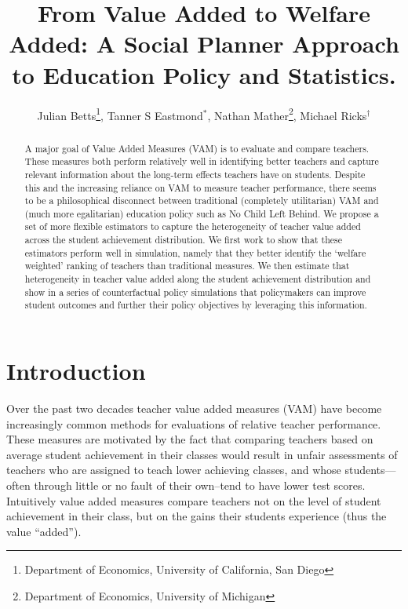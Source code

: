 \documentclass[letterpaper,12pt]{article}
\title{From Value Added to Welfare Added: A Social Planner Approach to Education Policy and Statistics.}
\author{Julian Betts\thanks{Department of Economics, University of California, San Diego}, Tanner S Eastmond$^*$,  Nathan Mather\thanks{Department of Economics, University of Michigan}, Michael Ricks$^\dagger$}
\date{\vspace{-8ex}}
\begin{document}
\maketitle





\begin{abstract}
    A major goal of Value Added Measures (VAM) is to evaluate and compare teachers. These measures both perform relatively well in identifying better teachers and capture relevant information about the long-term effects teachers have on students. Despite this and the increasing reliance on VAM to measure teacher performance, there seems to be a philosophical disconnect between traditional (completely utilitarian) VAM and (much more egalitarian) education policy such as No Child Left Behind. We propose a set of more flexible estimators to capture the heterogeneity of teacher value added across the student achievement distribution. We first work to show that these estimators perform well in simulation, namely that they better identify the ‘welfare weighted’ ranking of teachers than traditional measures. We then estimate that heterogeneity in teacher value added along the student achievement distribution and show in a series of counterfactual policy simulations that policymakers can improve student outcomes and further their policy objectives by leveraging this information.
\end{abstract}





\section{Introduction}

Over the past two decades teacher value added measures (VAM) have become increasingly common methods for evaluations of relative teacher performance. These measures are motivated by the fact that comparing teachers based on average student achievement in their classes would result in unfair assessments of teachers who are assigned to teach lower achieving classes, and whose students---often through little or no fault of their own--tend to have lower test scores. Intuitively value added measures compare teachers not on the level of student achievement in their class, but on the gains their students experience (thus the value ``added'').
\end{document}
